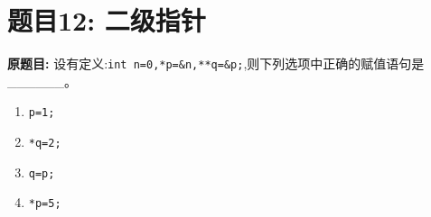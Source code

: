 \documentclass[a4paper,12pt]{article}
\begin{document}
\vspace{1cm}

\section*{题目12: 二级指针}

\textbf{原题目:}
设有定义:\texttt{int n=0,*p=\&n,**q=\&p;},则下列选项中正确的赋值语句是\_\_\_\_\_\_。
\begin{enumerate}
	\item[A)] \texttt{p=1;}
	\item[B)] \texttt{*q=2;}
	\item[C)] \texttt{q=p;}
	\item[D)] \texttt{*p=5;}
\end{enumerate}
\end{document}
